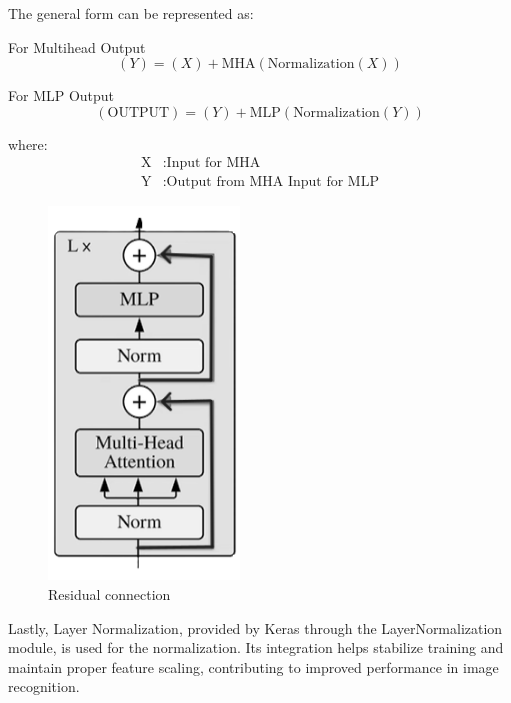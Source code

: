 \noindent The general form can be represented as:

\noindent For Multihead Output
\begin{equation}
    (Y) = (X) + \text{MHA} (\text{Normalization} (X)) \label{eq:multihead_output}
\end{equation}

\noindent For MLP Output
\begin{equation}
    (\text{OUTPUT}) = (Y) + \text{MLP} (\text{Normalization} (Y)) \label{eq:mlp_output}
\end{equation}

\noindent where:
\begin{align*}
    \text{X} & : \text{Input for MHA}                 \\
    \text{Y} & : \text{Output from MHA Input for MLP}
\end{align*}
\begin{figure}[htbp]
    \centering
    \includegraphics[width=2in]{img/residual connection.png}
    \caption{{Residual connection}}
\end{figure}

\noindent Lastly, Layer Normalization, provided by Keras through the LayerNormalization module, is used for the normalization. Its integration helps stabilize training and maintain proper feature scaling, contributing to improved performance in image recognition.

\newpage